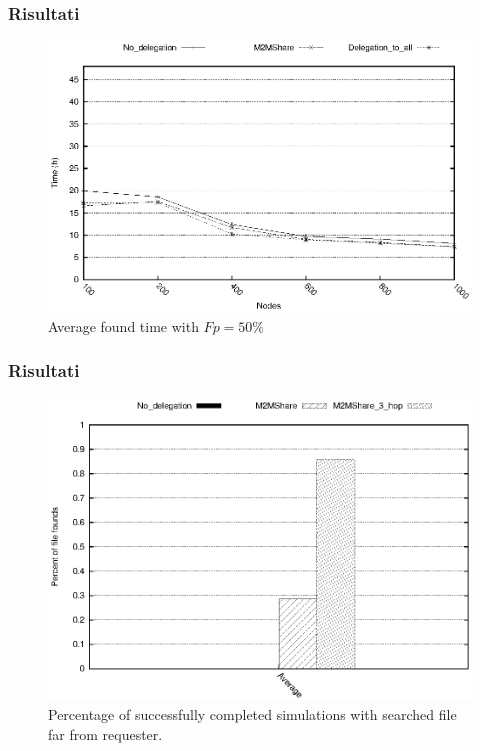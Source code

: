 \documentclass{beamer}
\begin{document}
\begin{frame}
\frametitle{Risultati}
\begin{center}
\begin{figure}[ht]
\includegraphics[scale=0.7]{../grafici/tempiVF_Fp50.eps}
\caption{Average found time with $Fp = 50\%$}
\end{figure}
\end{center}
\end{frame}

\begin{frame}
\frametitle{Risultati}
\begin{center}
\begin{figure}[ht]
\includegraphics[scale=0.7]{../grafici/percCompletaMultiHop.eps}
\caption{Percentage of successfully completed simulations with searched file far from requester.}
\end{figure}
\end{center}
\end{frame}
\end{document}

